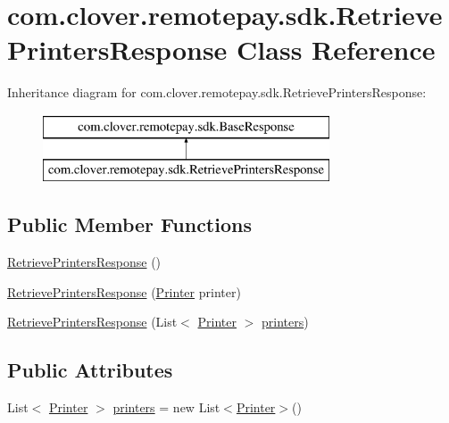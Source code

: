 \hypertarget{classcom_1_1clover_1_1remotepay_1_1sdk_1_1_retrieve_printers_response}{}\section{com.\+clover.\+remotepay.\+sdk.\+Retrieve\+Printers\+Response Class Reference}
\label{classcom_1_1clover_1_1remotepay_1_1sdk_1_1_retrieve_printers_response}
Inheritance diagram for com.\+clover.\+remotepay.\+sdk.\+Retrieve\+Printers\+Response\+:\begin{figure}[H]
\begin{center}
\leavevmode
\includegraphics[height=2.000000cm]{classcom_1_1clover_1_1remotepay_1_1sdk_1_1_retrieve_printers_response}
\end{center}
\end{figure}
\subsection*{Public Member Functions}
\begin{DoxyCompactItemize}
\item 
\hyperlink{classcom_1_1clover_1_1remotepay_1_1sdk_1_1_retrieve_printers_response_a5ab8c26e89fc2bead8341686fb39b6cc}{Retrieve\+Printers\+Response} ()
\item 
\hyperlink{classcom_1_1clover_1_1remotepay_1_1sdk_1_1_retrieve_printers_response_af1dcb5ed8a44063bc4b53eaecd8ac875}{Retrieve\+Printers\+Response} (\hyperlink{classcom_1_1clover_1_1sdk_1_1v3_1_1printer_1_1_printer}{Printer} printer)
\item 
\hyperlink{classcom_1_1clover_1_1remotepay_1_1sdk_1_1_retrieve_printers_response_adfce803752c70a225aa30633f90da450}{Retrieve\+Printers\+Response} (List$<$ \hyperlink{classcom_1_1clover_1_1sdk_1_1v3_1_1printer_1_1_printer}{Printer} $>$ \hyperlink{classcom_1_1clover_1_1remotepay_1_1sdk_1_1_retrieve_printers_response_a783e4f2e4a5d77a75aee9c1eaef83066}{printers})
\end{DoxyCompactItemize}
\subsection*{Public Attributes}
\begin{DoxyCompactItemize}
\item 
List$<$ \hyperlink{classcom_1_1clover_1_1sdk_1_1v3_1_1printer_1_1_printer}{Printer} $>$ \hyperlink{classcom_1_1clover_1_1remotepay_1_1sdk_1_1_retrieve_printers_response_a783e4f2e4a5d77a75aee9c1eaef83066}{printers} = new List$<$\hyperlink{classcom_1_1clover_1_1sdk_1_1v3_1_1printer_1_1_printer}{Printer}$>$()
\end{DoxyCompactItemize}
